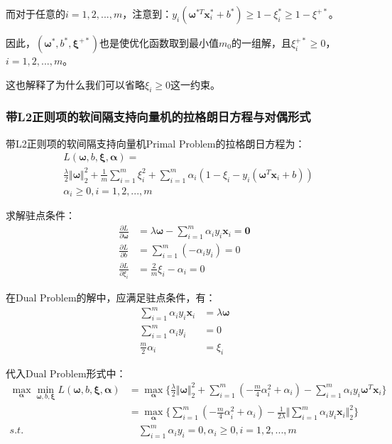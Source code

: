 \documentclass[12pt, a4paper]{article}
\newcommand{\ivec}{\bm}
\newcommand{\omegav}{\ivec{\omega}}
\newcommand{\xiv}{\ivec{\xi}}
\newcommand{\alphav}{\ivec{\alpha}}
\newcommand{\xv}{\ivec{x}}
\begin{document}
        而对于任意的$i=1, 2, ..., m$，注意到：$y_i (\omegav^{*T} \xv_i^* + b^*) \ge 1 - \xi_i^* \ge 1 - \xi^{+*}$。

        因此，$(\omegav^*, b^*, \xiv^{+*})$也是使优化函数取到最小值$m_0$的一组解，且$\xi_i^{+*} \ge 0$，$i = 1, 2, ..., m$。

        这也解释了为什么我们可以省略$\xi_i \ge 0$这一约束。

    \subsubsection{带L2正则项的软间隔支持向量机的拉格朗日方程与对偶形式}

        带L2正则项的软间隔支持向量机Primal Problem的拉格朗日方程为：
        \begin{equation}\begin{aligned}
        &L(\omegav, b, \xiv, \alphav) = \\
        &\frac{\lambda}{2} \Vert \omegav \Vert_2^2 + \frac{1}{m} \sum_{i = 1}^{m} \xi_i^2 + \sum_{i = 1}^{m} \alpha_i (1 - \xi_i - y_i (\omegav^T \xv_i + b)) \\
        &\alpha_i \ge 0, i = 1, 2, ..., m
        \end{aligned}\end{equation}

        求解驻点条件：
        \begin{align*}
        \frac{\partial L}{\partial \omegav} &= \lambda \omegav - \sum_{i = 1}^{m} \alpha_i y_i \xv_i = \ivec{0} \\
        \frac{\partial L}{\partial b} &= \sum_{i = 1}^{m} (- \alpha_i y_i) = 0 \\
        \frac{\partial L}{\partial \xi_i} &= \frac{2}{m} \xi_i - \alpha_i = 0
        \end{align*}

        在Dual Problem的解中，应满足驻点条件，有：
        \begin{align*}
        \sum_{i = 1}^{m} \alpha_i y_i \xv_i &= \lambda \omegav \\
        \sum_{i = 1}^{m} \alpha_i y_i &= 0 \\
        \frac{m}{2} \alpha_i &= \xi_i
        \end{align*}

        代入Dual Problem形式中：
        \begin{align*}
        \max\limits_{\alphav} \min\limits_{\omegav, b, \xiv} L(\omegav, b, \xiv, \alphav)
        &= \max\limits_{\alphav}\{\frac{\lambda}{2} \Vert \omegav \Vert_2^2 + \sum_{i = 1}^{m} (- \frac{m}{4}\alpha_i^2 + \alpha_i) - \sum_{i = 1}^{m} \alpha_i y_i \omegav^T \xv_i\} \\
        &= \max\limits_{\alphav}\{\sum_{i = 1}^{m} (- \frac{m}{4}\alpha_i^2 + \alpha_i) - \frac{1}{2 \lambda} \Vert \sum_{i = 1}^{m} \alpha_i y_i \xv_i \Vert_2^2\} \\
        s.t.& \quad \sum_{i = 1}^{m} \alpha_i y_i = 0, \alpha_i \ge 0, i = 1, 2, ..., m
        \end{align*}
\end{document}
